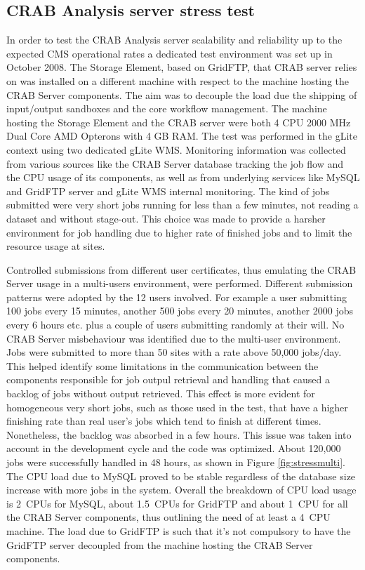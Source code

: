 \subsection{CRAB Analysis server stress test}
In order to test the CRAB Analysis server scalability and reliability up to
the expected CMS operational rates a dedicated test environment was
set up in October 2008. The Storage Element, based on GridFTP, 
that CRAB server relies on was installed on a different machine with 
respect to the machine hosting the CRAB Server components. The aim was 
to decouple the load
due the shipping of input/output sandboxes and the core workflow
management. The machine hosting the Storage Element and the CRAB
server were both 4 CPU 2000 MHz Dual Core AMD Opterons with 4 GB
RAM. The test was performed in the gLite context using two dedicated
gLite WMS. Monitoring information was collected from various sources
like the CRAB Server database tracking the job flow and the CPU usage
of its components, as well as from underlying services like MySQL and
GridFTP server and gLite WMS internal monitoring. The kind of
jobs submitted were very short jobs running for less than a few
minutes, not reading a dataset and without stage-out. This choice was
made to provide a harsher environment for job handling due to higher
rate of finished jobs and to limit the resource usage at sites.

Controlled submissions from different user certificates, thus 
emulating the CRAB Server usage in a multi-users environment, were performed.
Different submission patterns were adopted by the 12 users
involved. For example a user submitting 100 jobs every 15 minutes,
another 500 jobs every 20 minutes, another 2000 jobs every 6 hours
etc. plus a couple of users submitting randomly at their will.  No
CRAB Server misbehaviour was identified due to the multi-user
environment. %
Jobs were submitted to more than 50 sites with a rate above 50,000 jobs/day.
This helped identify some limitations in the communication between 
the components responsible for job outpul retrieval and handling that caused a backlog of jobs without output retrieved. This effect is more evident for homogeneous very short
jobs, such as those used in the test, that have a higher finishing rate
than real user's jobs which tend to finish at different times. Nonetheless, the backlog was absorbed in a few hours. This issue was
taken into account in the development cycle and the code was
optimized.  About 120,000 jobs were successfully handled in 48 hours,
as shown in Figure \ref{fig:stressmulti}.  The CPU load due to MySQL
proved to be stable regardless of the database size increase with more
jobs in the system. Overall the breakdown of CPU load usage is 2~CPUs
for MySQL, about 1.5~CPUs for GridFTP and about 1~CPU for all the CRAB
Server components, thus outlining the need of at least a 4~CPU
machine.  The load due to GridFTP is such that it's not compulsory to
have the GridFTP server decoupled from the machine hosting the CRAB
Server components.

